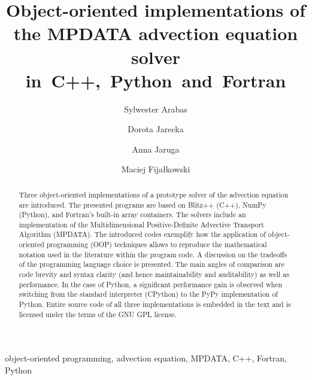 \documentclass[final,5p,times,twocolumn]{elsarticle}
\begin{document}
  \begin{frontmatter}

    \title{
      Object-oriented implementations of the MPDATA advection equation solver in~C++,~Python~and~Fortran
    }

    \author[1]{Sylwester Arabas}
    \author[1]{Dorota Jarecka}
    \author[1]{Anna Jaruga}
    \author[2]{Maciej Fijałkowski}

    \address[1]{Institute of Geophysics, Faculty of Physics, University of Warsaw}
    \address[2]{PyPy Team}

    \begin{abstract}
        Three object-oriented implementations of a prototype solver of the advection equation are introduced.
        The presented programs are based on Blitz++ (C++), NumPy (Python), and Fortran's built-in array containers.
        The solvers include an implementation of the Multidimensional Positive-Definite 
          Advective Transport Algorithm (MPDATA).
        The introduced codes exemplify how the application of 
          object-oriented programming (OOP) techniques allows to reproduce the mathematical notation 
          used in the literature within the program code.
        A discussion on the tradeoffs of the programming language choice is presented.
        The main angles of comparison are code brevity and syntax clarity
          (and hence maintainability and auditability) as well as performance.
        In the case of Python, a significant performance gain is observed when switching from the standard 
          interpreter (CPython) to the PyPy implementation of Python.
        Entire source code of all three implementations is embedded in the text and is licensed
          under the terms of the GNU GPL license. 
    \end{abstract}

    \begin{keyword}
      object-oriented programming, advection equation, MPDATA, C++, Fortran, Python
    \end{keyword}

  \end{frontmatter}

  \tableofcontents


\end{document}
